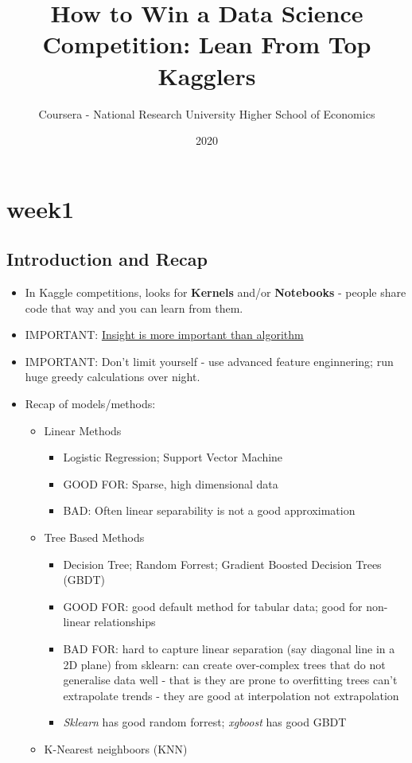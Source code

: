 \documentclass[a4paper]{report}
\title{How to Win a Data Science Competition: Lean From Top Kagglers}
\author{Coursera - National Research University Higher School of Economics}
\date{2020}
\begin{document}
\maketitle

\chapter{week1}
\section{Introduction and Recap}
\begin{itemize}
  \item In Kaggle competitions, looks for {\bf Kernels} and/or {\bf Notebooks} - people share code that way and you can learn from them.
  \item IMPORTANT: \underline{Insight is more important than algorithm}
  \item IMPORTANT: Don't limit yourself - use advanced feature enginnering; run huge greedy calculations over night.
  \item Recap of models/methods:
    \begin{itemize}
      \item Linear Methods
	\begin{itemize}
	  \item Logistic Regression; Support Vector Machine
	  \item GOOD FOR: Sparse, high dimensional data
	  \item BAD: Often linear separability is not a good approximation
	\end{itemize}
      \item Tree Based Methods
	\begin{itemize}
	  \item Decision Tree; Random Forrest; Gradient Boosted Decision Trees (GBDT)
	  \item GOOD FOR: good default method for tabular data; good for non-linear relationships
	  \item BAD FOR: hard to capture linear separation (say diagonal line in a 2D plane)
	    \subitem from sklearn: can create over-complex trees that do not generalise data well - that is they are prone to overfitting
	    \subitem trees can't extrapolate trends - they are good at interpolation not extrapolation
	  \item \emph{Sklearn} has good random forrest; \emph{xgboost} has good GBDT
	\end{itemize}
      \item K-Nearest neighboors (KNN)

\end{itemize}
\end{itemize}
\end{document}
